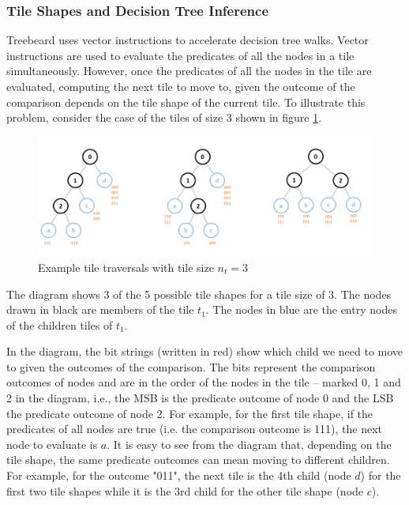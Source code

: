\subsubsection{Tile Shapes and Decision Tree Inference}
\label{Sec:TileShapesAndDecisionTreeInference}
Treebeard uses vector instructions to accelerate decision tree walks. Vector instructions are used to evaluate the predicates of all the nodes in a tile simultaneously. However, once the predicates of all the nodes in the tile are evaluated, computing the next tile to move to, given the outcome of the comparison depends on the tile shape of the current tile. To illustrate this problem, consider the case of the tiles of size 3 shown in figure \ref{Fig:TileTraversalTileSize3}. 
\begin{figure}
  \centering
  \includegraphics[width=\linewidth]{figures/TileTraversal_Size3.PNG}
  \caption{Example tile traversals with tile size $n_t=3$}
  \label{Fig:TileTraversalTileSize3}
\end{figure}
The diagram shows 3 of the 5 possible tile shapes for a tile size of 3. The nodes drawn in black are members of the tile $t_1$. The nodes in blue are the entry nodes of the children tiles of $t_1$. 


In the diagram, the bit strings (written in red) show which child we need to move to given the outcomes of the comparison. The bits represent the comparison outcomes of nodes and are in the order of the nodes in the tile -- marked 0, 1 and 2 in the diagram, i.e., the MSB is the predicate outcome of node 0 and the LSB the predicate outcome of node 2. For example, for the first tile shape, if the predicates of all nodes are true (i.e. the comparison outcome is 111), the next node to evaluate is $a$. 
It is easy to see from the diagram that, depending on the tile shape, the same predicate outcomes can mean moving to different children. For example, for the outcome "011", the next tile is the 4th child (node $d$) for the first two tile shapes while it is the 3rd child for the other tile shape (node $c$).

